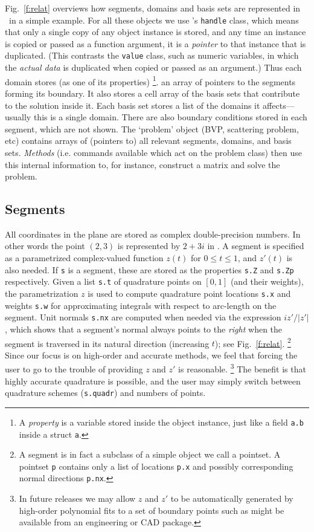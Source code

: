 \documentclass[12pt]{article}
\begin{document}
Fig.~\ref{f:relat} overviews how segments, domains and basis sets are
represented in \mpspack\ in a simple example.
For all these objects we use \matlab's {\tt handle} class,
which means that only a single copy of any object instance is
stored, and any time an instance is copied or passed as a function argument,
it is a {\em pointer} to that instance that is duplicated.
(This contrasts the {\tt value} class, such as numeric variables,
in which the {\em actual data} is duplicated when copied or passed as an
argument.)
Thus each domain stores (as one of its properties)%
  \footnote{A {\em property} is a variable stored inside the
    object instance, just like a field {\tt a.b} inside a struct {\tt a}.}.
an array of pointers to the
segments forming its boundary.
It also stores a cell array of the basis sets that
contribute to the solution inside it.
Each basis set stores a list of the domains it affects---usually
this is a single domain.
There are also boundary conditions stored in
each segment, which are not shown.
The `problem' object (BVP, scattering problem, etc) contains arrays of
(pointers to) all relevant segments, domains, and basis sets.
{\em Methods} (i.e. commands available which act on the problem class)
then use this internal information to, for instance,
construct a matrix and solve the problem.

\subsection{Segments} %

All coordinates in the plane are stored as complex double-precision
numbers. In other words the point 
$(2,3)$ is represented by $2+3i$ in \mpspack.
A segment is specified as a parametrized complex-valued
function $z(t)$ for $0\le t\le 1$, and $z'(t)$ is also needed.
If {\tt s} is a segment, these are stored as the properties
{\tt s.Z} and {\tt s.Zp} respectively.
Given a list {\tt s.t} of quadrature points on $[0,1]$
(and their weights),
the parametrization $z$ is used to compute quadrature point locations
{\tt s.x} and weights {\tt s.w}
for approximating integrals with respect to arc-length on the segment.
Unit normals {\tt s.nx} are computed when needed via the expression $iz'/|z'|$,
which shows that a segment's normal always points to the {\em right}
when the segment is traversed in its natural direction (increasing $t$);
see Fig.~\ref{f:relat}.%
  \footnote{A segment is in fact a
    subclass of a simple object we call a pointset.
    A pointset {\tt p} contains only a list of locations {\tt p.x}
    and possibly corresponding normal directions {\tt p.nx}.}
Since our focus is on high-order and accurate methods,
we feel that forcing the user to go to the trouble of providing $z$ and $z'$
is reasonable.%
  \footnote{In future releases we may allow $z$ and $z'$ to be automatically
    generated by high-order polynomial fits to a set of boundary points such
    as might be available from an engineering or CAD package.}
The benefit is that highly accurate quadrature is possible, and
the user may simply switch between quadrature schemes ({\tt s.quadr})
and numbers of points.
\end{document}
